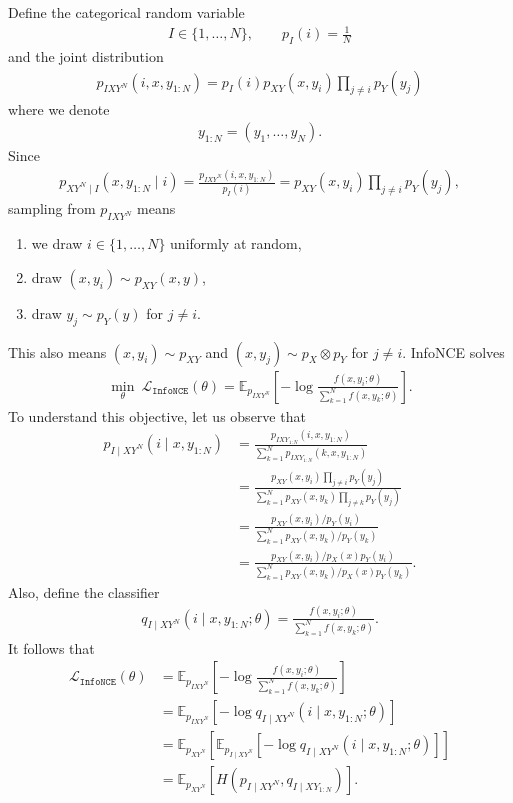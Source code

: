 \documentclass[11pt]{article}
\newcommand{\EE}{\mathbb{E}}
\newcommand{\LL}{\mathcal{L}}
\newcommand{\infonce}{\texttt{InfoNCE}}
\begin{document}
Define the categorical random variable
\begin{align*}
I \in \{1, \ldots, N\}, \qquad p_I(i) = \frac{1}{N}
\end{align*}
and the joint distribution
\begin{align*}
p_{IXY^N}(i,x,y_{1:N}) = p_I(i) p_{XY}(x,y_i) \prod_{j \neq i} p_Y(y_j)
\end{align*}
where we denote
\begin{align*}
y_{1:N} = (y_1, \ldots, y_N).
\end{align*}
Since
\begin{align*}
p_{XY^N \mid I}(x,y_{1:N} \mid i) = \frac{p_{IXY^N}(i,x,y_{1:N})}{p_I(i)} = p_{XY}(x,y_i) \prod_{j \neq i} p_Y(y_j),
\end{align*}
sampling from $p_{IXY^N}$ means
\begin{enumerate}
\item we draw $i \in \{1, \ldots, N\}$ uniformly at random,
\item draw $(x,y_i) \sim p_{XY}(x,y)$,
\item draw $y_j \sim p_Y(y)$ for $j \neq i$.
\end{enumerate}
This also means $(x,y_i) \sim p_{XY}$ and $(x,y_j) \sim p_X \otimes p_Y$ for $j \neq i$. InfoNCE solves
\begin{align*}
\min_\theta \ \LL_\infonce(\theta) = \EE_{p_{IXY^N}} \left[ - \log \frac{f(x,y_i;\theta)}{\sum_{k = 1}^N f(x,y_k;\theta)} \right].
\end{align*}
To understand this objective, let us observe that
\begin{align*}
p_{I \mid XY^N}(i \mid x, y_{1:N}) &= \frac{p_{IXY_{1:N}}(i,x,y_{1:N})}{\sum_{k = 1}^N p_{IXY_{1:N}}(k,x,y_{1:N})} \\
&= \frac{p_{XY}(x,y_i) \prod_{j \neq i} p_Y(y_j)}{\sum_{k = 1}^N p_{XY}(x,y_k) \prod_{j \neq k} p_Y(y_j)} \\
&= \frac{p_{XY}(x,y_i) / p_Y(y_i)}{\sum_{k = 1}^N p_{XY}(x,y_k) / p_Y(y_k)} \\
&= \frac{p_{XY}(x,y_i) / p_X(x)p_Y(y_i)}{\sum_{k = 1}^N p_{XY}(x,y_k) / p_X(x)p_Y(y_k)}.
\end{align*}
Also, define the classifier
\begin{align*}
q_{I \mid XY^N}(i \mid x,y_{1:N};\theta) = \frac{f(x,y_i;\theta)}{\sum_{k = 1}^N f(x,y_k;\theta)}.
\end{align*}
It follows that
\begin{align*}
\LL_\infonce(\theta) &= \EE_{p_{IXY^N}} \left[ - \log \frac{f(x,y_i;\theta)}{\sum_{k = 1}^N f(x,y_k;\theta)} \right] \\
&= \EE_{p_{IXY^N}} \left[ -\log q_{I \mid XY^N}(i \mid x,y_{1:N};\theta) \right] \\
&= \EE_{p_{XY^N}} \left[ \EE_{p_{I \mid XY^N}} \left[ -\log q_{I \mid XY^N}(i \mid x,y_{1:N};\theta) \right] \right] \\
&= \EE_{p_{XY^N}} \left[ H(p_{I \mid XY^N}, q_{I \mid XY_{1:N}}) \right].
\end{align*}
\end{document}
